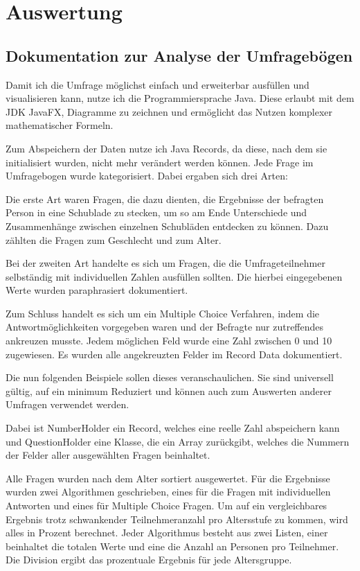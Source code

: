 \section{Auswertung}

\subsection{Dokumentation zur Analyse der Umfragebögen}

Damit ich die Umfrage möglichst einfach und erweiterbar ausfüllen und visualisieren kann, nutze ich die Programmiersprache Java. 
Diese erlaubt mit dem JDK JavaFX, Diagramme zu zeichnen und ermöglicht das Nutzen komplexer mathematischer Formeln.

Zum Abspeichern der Daten nutze ich Java Records, da diese, nach dem sie initialisiert wurden, nicht mehr verändert werden können.
Jede Frage im Umfragebogen wurde kategorisiert. Dabei ergaben sich drei Arten: 

Die erste Art waren Fragen, die dazu dienten, die
Ergebnisse der befragten Person in eine Schublade zu stecken, um so am Ende Unterschiede und Zusammenhänge zwischen einzelnen
Schubläden entdecken zu können. Dazu zählten die Fragen zum Geschlecht und zum Alter. 

Bei der zweiten Art handelte es sich um Fragen,
die die Umfrageteilnehmer selbständig mit individuellen Zahlen ausfüllen sollten. Die hierbei eingegebenen Werte wurden 
paraphrasiert dokumentiert. 

Zum Schluss handelt es sich um ein Multiple Choice Verfahren, indem die Antwortmöglichkeiten vorgegeben waren und der
Befragte nur zutreffendes ankreuzen musste. Jedem möglichen Feld wurde eine Zahl zwischen 0 und 10 zugewiesen. Es wurden alle 
angekreuzten Felder im Record Data dokumentiert.

Die nun folgenden Beispiele sollen dieses veranschaulichen. Sie sind universell gültig, auf ein minimum Reduziert und können auch zum 
Auswerten anderer Umfragen verwendet werden.

Dabei ist NumberHolder ein Record, welches eine reelle Zahl abspeichern kann und QuestionHolder eine Klasse, die ein Array 
zurückgibt, welches die Nummern der Felder aller ausgewählten Fragen beinhaltet.

Alle Fragen wurden nach dem Alter sortiert ausgewertet. Für die Ergebnisse wurden zwei Algorithmen geschrieben, eines für die Fragen
mit individuellen Antworten und eines für Multiple Choice Fragen. Um auf ein vergleichbares Ergebnis trotz schwankender 
Teilnehmeranzahl pro Altersstufe zu kommen, wird alles in Prozent berechnet. Jeder Algorithmus besteht aus zwei Listen, einer 
beinhaltet die totalen Werte und eine die Anzahl an Personen pro Teilnehmer. Die Division ergibt das prozentuale Ergebnis für jede 
Altersgruppe.

